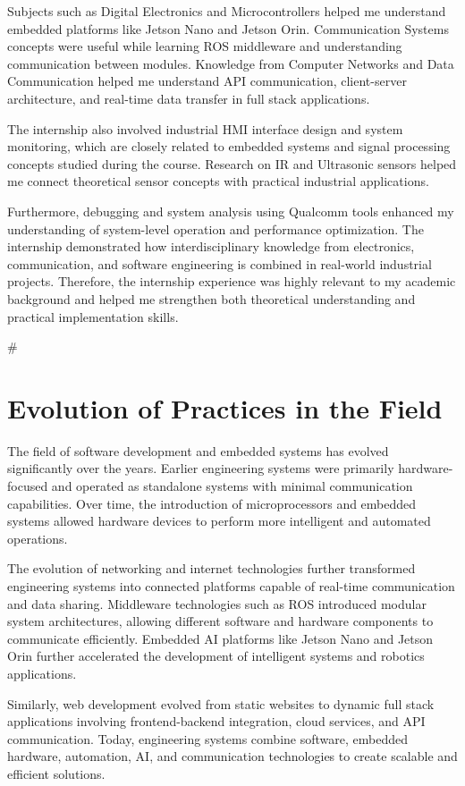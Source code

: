 \documentclass[12pt,a4paper]{report}
\begin{document}
Subjects such as Digital Electronics and Microcontrollers helped me understand embedded platforms like Jetson Nano and Jetson Orin. Communication Systems concepts were useful while learning ROS middleware and understanding communication between modules. Knowledge from Computer Networks and Data Communication helped me understand API communication, client-server architecture, and real-time data transfer in full stack applications.


The internship also involved industrial HMI interface design and system monitoring, which are closely related to embedded systems and signal processing concepts studied during the course. Research on IR and Ultrasonic sensors helped me connect theoretical sensor concepts with practical industrial applications.


Furthermore, debugging and system analysis using Qualcomm tools enhanced my understanding of system-level operation and performance optimization. The internship demonstrated how interdisciplinary knowledge from electronics, communication, and software engineering is combined in real-world industrial projects. Therefore, the internship experience was highly relevant to my academic background and helped me strengthen both theoretical understanding and practical implementation skills.


\#


\section{Evolution of Practices in the Field}

The field of software development and embedded systems has evolved significantly over the years. Earlier engineering systems were primarily hardware-focused and operated as standalone systems with minimal communication capabilities. Over time, the introduction of microprocessors and embedded systems allowed hardware devices to perform more intelligent and automated operations.


The evolution of networking and internet technologies further transformed engineering systems into connected platforms capable of real-time communication and data sharing. Middleware technologies such as ROS introduced modular system architectures, allowing different software and hardware components to communicate efficiently. Embedded AI platforms like Jetson Nano and Jetson Orin further accelerated the development of intelligent systems and robotics applications.


Similarly, web development evolved from static websites to dynamic full stack applications involving frontend-backend integration, cloud services, and API communication. Today, engineering systems combine software, embedded hardware, automation, AI, and communication technologies to create scalable and efficient solutions.
\end{document}
